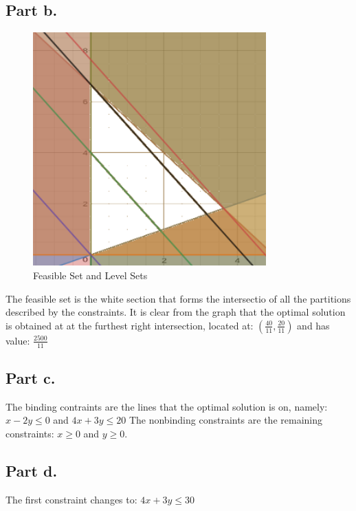 \documentclass[12pt, letterpaper]{paper}
\begin{document}
\subsection*{Part b.}
\begin{figure}[h!]
\centering
\includegraphics[width=0.8\textwidth]{q5b.png}
\caption{ Feasible Set and Level Sets }
\end{figure}

The feasible set is the white section that forms the intersectio of all the partitions described by the constraints. It is clear from the graph that the optimal solution is obtained at at the furthest right intersection, located at: $( \frac{40}{11},\frac{20}{11})$ and has value: $\frac{2500}{11}$ 

\subsection*{Part c.}
The binding contraints are the lines that the optimal solution is on, namely: $x - 2y \leq 0$ and $4x + 3y \leq 20$ 
\newline
The nonbinding constraints are the remaining constraints: $x \geq 0$ and $y \geq 0$.

\subsection*{Part d.}
The first constraint changes to: $4x+3y\leq 30$ 
\end{document}

